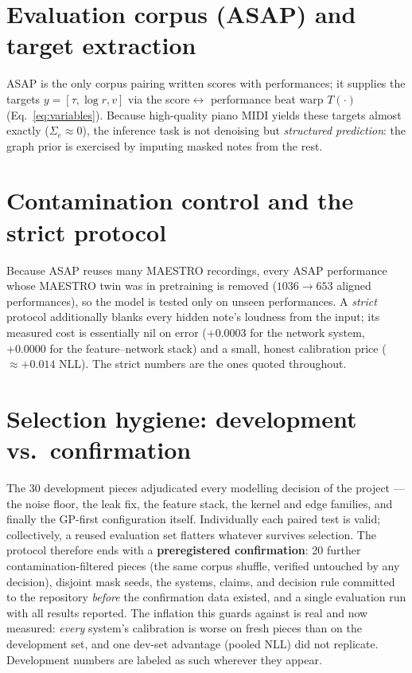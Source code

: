 \documentclass[11pt,a4paper]{report}
\newcommand{\nPieces}{30}
\newcommand{\nConfPieces}{20}
\begin{document}
\section{Evaluation corpus (ASAP) and target extraction}
ASAP \cite{asap} is the only corpus pairing written scores with performances; it
supplies the targets $y = [\tau, \log r, v]$ via the score$\leftrightarrow$
performance beat warp $T(\cdot)$ (Eq.~\ref{eq:variables}). Because high-quality piano
MIDI yields these targets almost exactly ($\Sigma_e \approx 0$), the inference task
is not denoising but \emph{structured prediction}: the graph prior is exercised by
imputing masked notes from the rest.

\section{Contamination control and the strict protocol}\label{sec:contam}
Because ASAP reuses many MAESTRO recordings, every ASAP performance whose MAESTRO
twin was in pretraining is removed ($1036 \to 653$ aligned performances), so the
model is tested only on unseen performances. A \emph{strict} protocol additionally
blanks every hidden note's loudness from the input; its measured cost is essentially
nil on error ($+0.0003$ for the network system, $+0.0000$ for the feature--network
stack) and a small, honest calibration price ($\approx +0.014$ NLL). The strict
numbers are the ones quoted throughout.

\section{Selection hygiene: development vs.\ confirmation}\label{sec:hygiene}
The \nPieces{} development pieces adjudicated every modelling decision of the
project --- the noise floor, the leak fix, the feature stack, the kernel and edge
families, and finally the GP-first configuration itself. Individually each paired
test is valid; collectively, a reused evaluation set flatters whatever survives
selection. The protocol therefore ends with a \textbf{preregistered confirmation}:
\nConfPieces{} further contamination-filtered pieces (the same corpus shuffle,
verified untouched by any decision), disjoint mask seeds, the systems, claims, and
decision rule committed to the repository \emph{before} the confirmation data
existed, and a single evaluation run with all results reported. The inflation this
guards against is real and now measured: \emph{every} system's calibration is worse
on fresh pieces than on the development set, and one dev-set advantage
(pooled NLL) did not replicate. Development numbers are labeled as such wherever
they appear.
\end{document}
